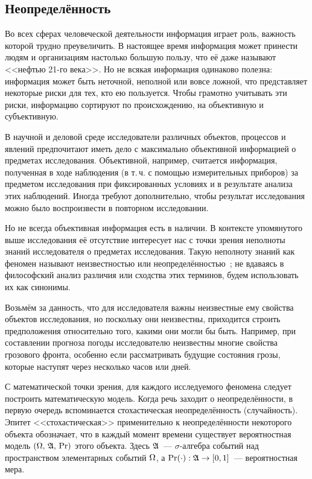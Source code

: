 
\subsection{Неопределённость}
\label{sec:intro_uncertainty}

Во всех сферах человеческой деятельности информация играет роль, важность которой трудно преувеличить. В настоящее время информация  может принести людям и организациям настолько большую пользу, что её даже называют <<нефтью 21-го века>>. Но не всякая информация одинаково полезна: информация может быть неточной, неполной или вовсе ложной, что представляет некоторые риски для тех, кто ею пользуется. Чтобы грамотно учитывать эти риски, информацию сортируют по происхождению, на объективную и субъективную.

В научной и деловой среде исследователи различных объектов, процессов и явлений предпочитают иметь дело с максимально объективной информацией о предметах исследования. Объективной, например, считается информация, полученная в ходе наблюдения (в т.\,ч. с помощью измерительных приборов) за предметом исследования при фиксированных условиях и в результате анализа этих наблюдений. Иногда требуют дополнительно, чтобы результат исследования можно было воспроизвести в повторном исследовании. 
  
Но не всегда объективная информация есть в наличии. В контексте упомянутого выше исследования её отсутствие интересует нас с точки зрения неполноты знаний исследователя о предметах исследования. Такую неполноту знаний как феномен называют неизвестностью или неопределённостью~\cite{falomkina}; не вдаваясь в философский анализ различия или сходства этих терминов, будем использовать их как синонимы.  

Возьмём за данность, что для исследователя важны неизвестные ему свойства объектов исследования, но поскольку они неизвестны, приходится строить предположения относительно того, какими они могли бы быть. Например, при составлении прогноза погоды исследователю неизвестны многие свойства грозового фронта, особенно если рассматривать будущие состояния грозы, которые наступят через несколько часов или дней.

С математической точки зрения, для каждого исследуемого феномена следует построить математическую модель.  Когда речь заходит о неопределённости, в первую очередь вспоминается стохастическая неопределённость (случайность). Эпитет <<стохастическая>> применительно к неопределённости некоторого объекта обозначает, что в каждый момент времени существует вероятностная модель ${(\Omega,\,{\mathfrak{A}},\,{\mathrm{Pr}})}$ этого объекта. Здесь ${\mathfrak{A}}$~--- $\sigma$-алгебра событий над пространством элементарных событий $\Omega$, а ${\mathrm{Pr}}(\cdot):  {\mathfrak{A}} \to [0,1]$~--- вероятностная мера. 


